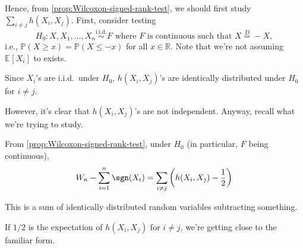 Hence, from \autoref{prop:Wilcoxon-signed-rank-test}, we should first study \(\sum_{i \neq j} h(X_i, X_j)\). First, consider testing
\[
	H_0 \colon X, X_1, \dots , X_n \overset{\text{i.i.d.} }{\sim } F \text{ where \(F\) is continuous such that } X \overset{D}{=} -X,
\]
i.e., \(\mathbb{P} (X \geq x) = \mathbb{P} (X \leq -x)\) for all \(x \in \mathbb{R}\). Note that we're not assuming \(\mathbb{E}_{}[X_i] \) to exists.

\begin{note}
	Since \(X_i\)'s are i.i.d.\ under \(H_0\), \(h(X_i, X_j)\)'s are identically distributed under \(H_0\) for \(i \neq j\).
\end{note}

However, it's clear that \(h(X_i, X_j)\)'s are not independent. Anyway, recall what we're trying to study.

\begin{prev}
	From \autoref{prop:Wilcoxon-signed-rank-test}, under \(H_0\) (in particular, \(F\) being continuous),
	\[
		W_n - \sum_{i=1}^{n} \sgn (X_i)
		= \sum_{i \neq j} \left( h(X_i , X_j) - \frac{1}{2} \right)
	\]
\end{prev}
This is a sum of identically distributed random variables subtracting something.

\begin{intuition}
	If \(1 / 2\) is the expectation of \(h(X_i, X_j)\) for \(i \neq j\), we're getting close to the familiar form.
\end{intuition}

